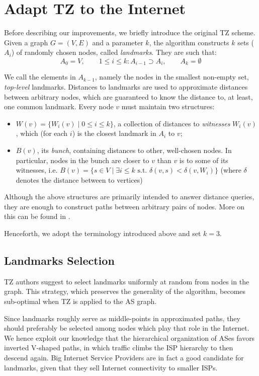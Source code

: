 \documentclass[a4paper,11pt,oneside]{report}
\begin{document}
\chapter{Adapt TZ to the Internet}
\label{chap.adapt-tz-internet}

Before describing our improvements, we briefly introduce the original TZ scheme. Given a graph $G=(V, E)$ and a parameter $k$, the algorithm constructs $k$ sets ($A_i$) of randomly chosen nodes, called \emph{landmarks}. They are such that:
\[
A_0 = V, \qquad 1 \leq i \leq k: A_{i-1} \supset A_i, \qquad A_k = \emptyset
\]

We call the elements in $A_{k-1}$, namely the nodes in the smallest non-empty set, \emph{top-level} landmarks.
Distances to landmarks are used to approximate distances between arbitrary nodes, which are guaranteed to know the distance to, at least, one common landmark. Every node $v$ must maintain two structures:
\begin{itemize}
\item $W(v) = \{W_i(v) \;|\; 0 \leq i \leq k \}$, a collection of distances to \emph{witnesses} $W_i(v)$, which (for each $i$) is the closest landmark in $A_i$ to $v$;
\item $B(v)$, its \emph{bunch}, containing distances to other, well-chosen nodes. In particular, nodes in the bunch are closer to $v$ than $v$ is to some of its witnesses, i.e. $B(v) = \{s \in V \;\vert\; \exists i \leq k \text{ s.t. } \delta(v, s) < \delta(v, W_i)\}$ (where $\delta$ denotes the distance between to vertices)
\end{itemize}

Although the above structures are primarily intended to answer distance queries, they are enough to construct paths between arbitrary pairs of nodes. More on this can be found in \cite{thorupApproximateDistanceOracles2005}.

Henceforth, we adopt the terminology introduced above and set $k=3$.

\section{Landmarks Selection}
TZ authors suggest to select landmarks uniformly at random from nodes in the graph. This strategy, which preserves the generality of the algorithm, becomes sub-optimal when TZ is applied to the AS graph.

Since landmarks roughly serve as middle-points in approximated paths, they should preferably be selected among nodes which play that role in the Internet. We hence exploit our knowledge that the hierarchical organization of ASes favors inverted V-shaped paths, in which traffic climbs the ISP hierarchy to then descend again. Big Internet Service Providers are in fact a good candidate for landmarks, given that they sell Internet connectivity to smaller ISPs.
\end{document}

